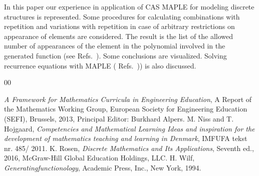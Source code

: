 \documentclass[11pt]{article}
\begin{document}
In this paper our experience in application of CAS MAPLE for modeling discrete structures is represented. Some procedures for calculating combinations with repetition and variations with repetition in case of arbitrary restrictions on appearance of elements are considered. The result is the list of the allowed number of appearances of the element in the polynomial involved in the generated function  (see Refs.~\cite{GEN}). Some conclusions are visualized. Solving recurrence equations with MAPLE ( Refs.~\cite{ROS})) is also discussed.










\begin{thebibliography}{00}
\setlength{\itemsep}{-1mm}
\footnotesize
{} 	\textit{A Framework for Mathematics Curricula in Engineering Education}, A Report of the Mathematics Working Group, European Society for Engineering Education (SEFI), Brussels, 2013, Principal Editor: Burkhard Alpers.
 	M. Niss and T. Hojgaard, \textit{Competencies and Mathematical Learning Ideas and inspiration for the development of mathematics teaching and learning in Denmark}, IMFUFA tekst nr. 485/ 2011.
 K. Rosen, \textit{Discrete Mathematics and Its Applications}, Seventh ed., 2016, McGraw-Hill Global Education Holdings, LLC.
 H. Wilf, \textit{Generatingfunctionology}, Academic Press, Inc., New York, 1994.
\end{thebibliography}
\normalsize
\end{document}

